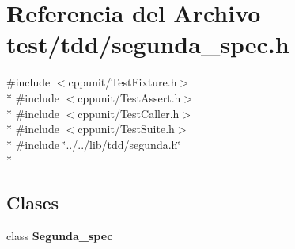 \section{Referencia del Archivo test/tdd/segunda\+\_\+spec.h}
\label{segunda__spec_8h}
{\ttfamily \#include $<$cppunit/\+Test\+Fixture.\+h$>$}\\*
{\ttfamily \#include $<$cppunit/\+Test\+Assert.\+h$>$}\\*
{\ttfamily \#include $<$cppunit/\+Test\+Caller.\+h$>$}\\*
{\ttfamily \#include $<$cppunit/\+Test\+Suite.\+h$>$}\\*
{\ttfamily \#include \char`\"{}../../lib/tdd/segunda.\+h\char`\"{}}\\*
\subsection*{Clases}
\begin{DoxyCompactItemize}
\item 
class {\bf Segunda\+\_\+spec}
\end{DoxyCompactItemize}
